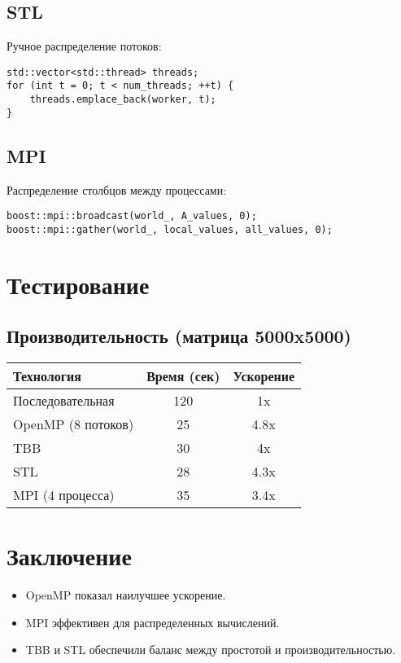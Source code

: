 \documentclass[12pt]{article}
\begin{document}
\subsection*{STL}
Ручное распределение потоков:
\begin{lstlisting}
std::vector<std::thread> threads;
for (int t = 0; t < num_threads; ++t) {
    threads.emplace_back(worker, t);
}
\end{lstlisting}

\subsection*{MPI}
Распределение столбцов между процессами:
\begin{lstlisting}
boost::mpi::broadcast(world_, A_values, 0);
boost::mpi::gather(world_, local_values, all_values, 0);
\end{lstlisting}

\section{Тестирование}
\subsection*{Производительность (матрица 5000x5000)}
\begin{tabular}{|l|c|c|}
    \toprule
    Технология & Время (сек) & Ускорение \\
    \midrule
    Последовательная & 120 & 1x \\
    OpenMP (8 потоков) & 25 & 4.8x \\
    TBB & 30 & 4x \\
    STL & 28 & 4.3x \\
    MPI (4 процесса) & 35 & 3.4x \\
    \bottomrule
\end{tabular}

\section*{Заключение}
\begin{itemize}
    \item OpenMP показал наилучшее ускорение.
    \item MPI эффективен для распределенных вычислений.
    \item TBB и STL обеспечили баланс между простотой и производительностью.
\end{itemize}
\end{document}
